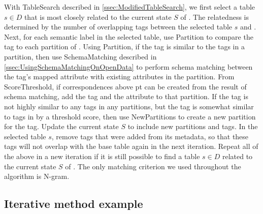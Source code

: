 With TableSearch described in \autoref{ssec:ModifiedTableSearch}, we first select a table $s\in D$ that is most closely related to the current state $S$ of . The relatedness is determined by the number of overlapping tags between the selected table $s$ and . Next, for each semantic label in the selected table, use Partition to compare the tag to each partition of . Using Partition, if the tag is similar to the tags in a partition, then use SchemaMatching described in \autoref{ssec:UsingSchemaMatchingOnOpenData} to perform schema matching between the tag's mapped attribute with existing attributes in the partition. From ScoreThreshold, if correspondences above pt can be created from the result of schema matching, add the tag and the attribute to that partition. If the tag is not highly similar to any tags in any partitions, but the tag is somewhat similar to tags in  by a threshold score, then use NewPartitions to create a new partition for the tag. Update the current state $S$ to include new partitions and tags. In the selected table $s$, remove tags that were added from its metadata, so that these tags will not overlap with the base table again in the next iteration. Repeat all of the above in a new iteration if it is still possible to find a table $s\in D$ related to the current state $S$ of . The only matching criterion we used throughout the algorithm is N-gram.

\subsection{Iterative method example}
\label{ssec:IterativeMethodExample}

